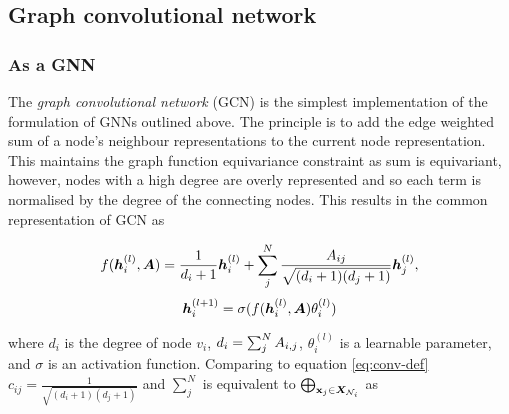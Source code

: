 




\subsection{Graph convolutional network}
\label{sec:GCN}



\subsubsection{As a GNN}

The \emph{graph convolutional network} (GCN) is the simplest implementation of the formulation of GNNs outlined above.
The principle is to add the edge weighted sum of a node's neighbour representations to the current node representation.
This maintains the graph function equivariance constraint as sum is equivariant, however, nodes with a high degree are overly represented and so each term is normalised by the degree of the connecting nodes.
This results in the common representation of GCN as

\begin{equation}
    \label{eq:GCN-as-GNN}
    f({\bm{h}}_i^{(l)}, {\bm{A}}) = \frac1{d_i + 1}{\bm{h}}_i^{(l)} + \sum_j^N\frac{{A}_{ij}}{\sqrt{(d_i + 1)(d_j + 1)}}{\bm{h}}_j^{(l)},
\end{equation}
\begin{equation}
    {\bm{h}}_i^{(l+1)} = \sigma(f({\bm{h}}_i^{(l)}, {\bm{A}})\theta_i^{(l)})
\end{equation}

where $d_i$ is the degree of node $v_i$, $d_i = \sum_j^N {A}_{i,j}$, $\theta_i^{(l)}$ is a learnable parameter, and $\sigma$ is an activation function. Comparing to equation \ref{eq:conv-def} $c_{ij} = \frac1{\sqrt{(d_i + 1)(d_j + 1)}}$ and $\sum_j^N$ is equivalent to $\bigoplus_{{\textbf{x}}_j \in {\bm{X}}_{{\mathcal{N}}_i}}$ as 

